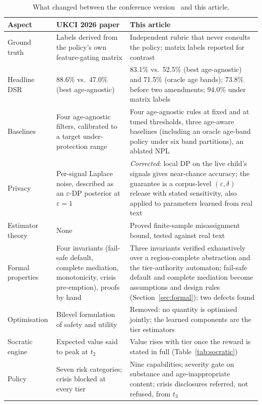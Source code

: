 \begin{table}[tbp]
\caption{What changed between the conference version~\cite{Ejaz2026UKCI} and this article.\label{tab:conference}}
\small
\begin{tabularx}{\textwidth}{>{\raggedright\arraybackslash}p{2.3cm}LL}
\toprule
\textbf{Aspect} & \textbf{UKCI 2026 paper} & \textbf{This article} \\
\midrule
Ground truth & Labels derived from the policy's own feature-gating matrix & Independent rubric that never consults the policy; matrix labels reported for contrast \\
Headline DSR & 88.6\% vs.\ 47.0\% (best age-agnostic) & 83.1\% vs.\ 52.5\% (best age-agnostic) and 71.5\% (oracle age bands); 73.8\% before two amendments; 94.0\% under matrix labels \\
Baselines & Four age-agnostic filters, calibrated to a target under-protection range & Four age-agnostic rules at fixed and at tuned thresholds, three age-aware baselines (including an oracle age-band policy under six band partitions), an ablated NPL \\
Privacy & Per-signal Laplace noise, described as an $\varepsilon$-DP posterior at $\varepsilon=1$ & \emph{Corrected}: local DP on the live child's signals gives near-chance accuracy; the guarantee is a corpus-level $(\varepsilon,\delta)$ release with stated sensitivity, also applied to parameters learned from real text \\
Estimator theory & None & Proved finite-sample misassignment bound, tested against real text \\
Formal properties & Four invariants (fail-safe default, complete mediation, monotonicity, crisis pre-emption), proofs by hand & Three invariants verified exhaustively over a region-complete abstraction and the tier-authority automaton; fail-safe default and complete mediation become assumptions and design rules (Section~\ref{sec:formal}); two defects found \\
Optimisation & Bilevel formulation of safety and utility & Removed: no quantity is optimised jointly; the learned components are the tier estimators \\
Socratic engine & Expected value said to peak at $t_2$ & Value rises with tier once the reward is stated in full (Table~\ref{tab:socratic}) \\
Policy & Seven risk categories; crisis blocked at every tier & Nine capabilities; severity gate on substance and age-inappropriate content; crisis disclosures referred, not refused, from $t_3$ \\

\end{tabularx}
\end{table}
